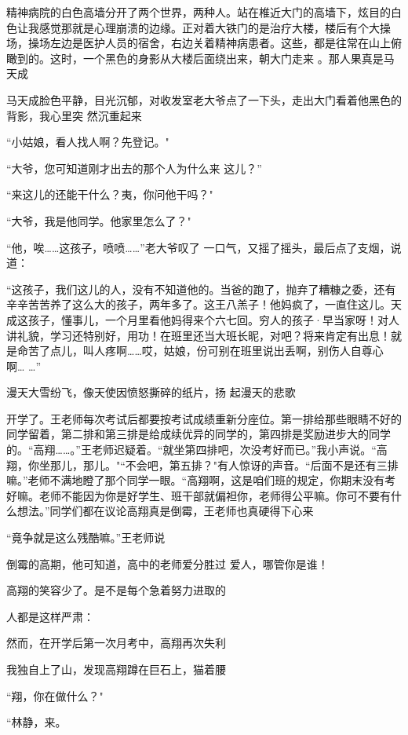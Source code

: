 \documentclass{article}
\begin{document}
精神病院的白色高墙分开了两个世界，两种人。站在椎近大门的高墙下，炫目的白色让我感觉那就是心理崩溃的边缘。正对着大铁门的是治疗大楼，楼后有个大操场，操场左边是医护人员的宿舍，右边关着精神病患者。这些，都是往常在山上俯瞰到的。这时，一个黑色的身影从大楼后面绕出来，朝大门走来
。那人果真是马天成 

马天成脸色平静，目光沉郁，对收发室老大爷点了一下头，走出大门看着他黑色的背影，我心里突
然沉重起来 


\newpage

“小姑娘，看人找人啊？先登记。" 

“大爷，您可知道刚才出去的那个人为什么来
这儿？” 

“来这儿的还能干什么？夷，你问他干吗？"


“大爷，我是他同学。他家里怎么了？" 

“他，唉……这孩子，喷喷……”老大爷叹了
一口气，又摇了摇头，最后点了支烟，说道： 

“这孩子，我们这儿的人，没有不知道他的。当爸的跑了，抛弃了糟糠之委，还有辛辛苦苦养了这么大的孩子，两年多了。这王八羔子！他妈疯了，一直住这儿。天成这孩子，懂事儿，一个月里看他妈得来个六七回。穷人的孩子·早当家呀！对人讲礼貌，学习还特别好，用功！在班里还当大班长昵，对吧？将来肯定有出息！就是命苦了点儿，叫人疼啊……哎，姑娘，份可别在班里说出丢啊，别伤人自尊心啊…
…” 

\newpage

漫天大雪纷飞，像天使因愤怒撕碎的纸片，扬
起漫天的悲歌 

开学了。王老师每次考试后都要按考试成绩重新分座位。第一排给那些眼睛不好的同学留着，第二排和第三排是给成续优异的同学的，第四排是奖励进步大的同学的。“高翔……。”王老师迟疑着。“就坐第四排吧，次没考好而已。”我小声说。“高翔，你坐那儿，那儿。"“不会吧，第五排？"有人惊讶的声音。“后面不是还有三排嘛。”老师不满地瞪了那个同学一眼。“高翔啊，这是咱们班的规定，你期末没有考好嘛。老师不能因为你是好学生、班干部就偏袒你，老师得公平嘛。你可不要有什么想法。”同学们都在议论高翔真是倒霉，王老师也真硬得下心来


“竟争就是这么残酷嘛。”王老师说 

倒霉的高期，他可知道，高中的老师爱分胜过
爱人，哪管你是谁！ 

高翔的笑容少了。是不是每个急着努力进取的
\newpage

人都是这样严肃： 

然而，在开学后第一次月考中，高翔再次失利

我独自上了山，发现高翔蹲在巨石上，猫着腰


“翔，你在做什么？" 


“林静，来。 
\end{document}
